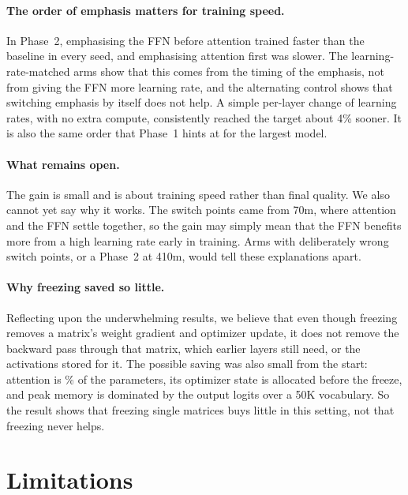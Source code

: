 \documentclass[11pt]{article}
\begin{document}
\paragraph{The order of emphasis matters for training speed.} In Phase~2,
emphasising the FFN before attention trained faster than the baseline in every
seed, and emphasising attention first was slower. The learning-rate-matched
arms show that this comes from the timing of the emphasis, not from giving the
FFN more learning rate, and the alternating control shows that switching
emphasis by itself does not help. A simple per-layer change of learning rates,
with no extra compute, consistently reached the target about 4\% sooner. It
is also the same order that Phase~1 hints at for the largest model.

\paragraph{What remains open.} The gain is small and is about training speed
rather than final quality. We also cannot yet say why it works. The switch
points came from 70m, where attention and the FFN settle together, so the
gain may simply mean that the FFN benefits more from a high learning rate
early in training. Arms with deliberately wrong switch points, or a Phase~2
at 410m, would tell these explanations apart.

\paragraph{Why freezing saved so little.} Reflecting upon the underwhelming results, we believe that even though freezing removes a matrix's weight gradient and optimizer
update, it does not remove the backward pass through that matrix, which
earlier layers still need, or the activations stored for it. The possible
saving was also small from the start: attention is \ParamPctAttn\% of the
parameters, its optimizer state is allocated before the freeze, and peak
memory is dominated by the output logits over a 50K vocabulary. So the result
shows that freezing single matrices buys little in this setting, not that
freezing never helps. 

\section{Limitations}
\end{document}
